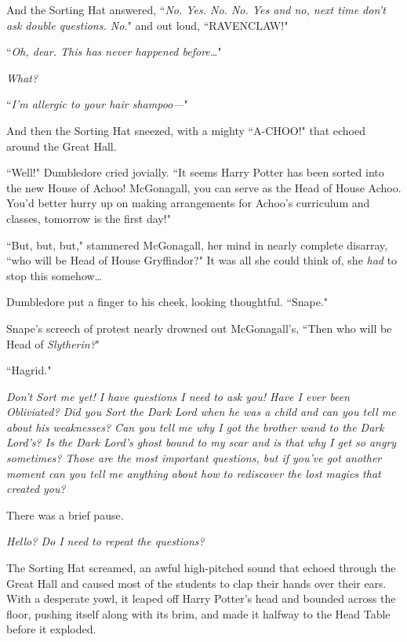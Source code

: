 And the Sorting Hat answered, ``\emph{No. Yes. No. No. Yes and no, next time don't ask double questions. No.}" and out loud, ``RAVENCLAW!"

\later

``\emph{Oh, dear. This has never happened before{\ldots}}"

\emph{What?}

``\emph{I'm allergic to your hair shampoo—}"

And then the Sorting Hat sneezed, with a mighty ``A-CHOO!" that echoed around the Great Hall.

``Well!" Dumbledore cried jovially. ``It seems Harry Potter has been sorted into the new House of Achoo! McGonagall, you can serve as the Head of House Achoo. You'd better hurry up on making arrangements for Achoo's curriculum and classes, tomorrow is the first day!"

``But, but, but," stammered McGonagall, her mind in nearly complete disarray, ``who will be Head of House Gryffindor?" It was all she could think of, she \emph{had} to stop this somehow{\ldots}

Dumbledore put a finger to his cheek, looking thoughtful. ``Snape."

Snape's screech of protest nearly drowned out McGonagall's, ``Then who will be Head of \emph{Slytherin?}"

``Hagrid."

\later

\emph{Don't Sort me yet! I have questions I need to ask you! Have I ever been Obliviated? Did you Sort the Dark Lord when he was a child and can you tell me about his weaknesses? Can you tell me why I got the brother wand to the Dark Lord's? Is the Dark Lord's ghost bound to my scar and is that why I get so angry sometimes? Those are the most important questions, but if you've got another moment can you tell me anything about how to rediscover the lost magics that created you?}

There was a brief pause.

\emph{Hello? Do I need to repeat the questions?}

The Sorting Hat screamed, an awful high-pitched sound that echoed through the Great Hall and caused most of the students to clap their hands over their ears. With a desperate yowl, it leaped off Harry Potter's head and bounded across the floor, pushing itself along with its brim, and made it halfway to the Head Table before it exploded.

\later

